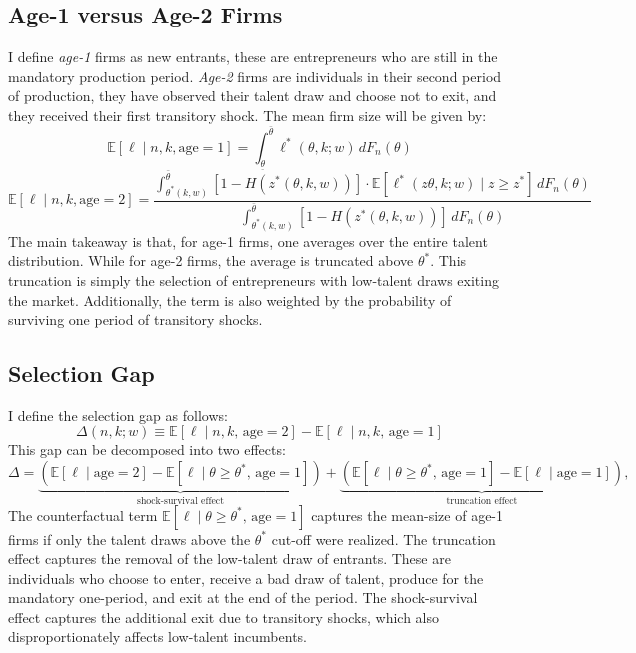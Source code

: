 
    \subsection{Age-1 versus Age-2 Firms}

    I define \textit{age-1} firms as new entrants, these are entrepreneurs who are still in the mandatory production period. \textit{Age-2} firms are individuals in their second period of production, they have observed their talent draw and choose not to exit, and they received their first transitory shock. The mean firm size will be given by:
    \begin{equation}
        \mathbb{E}[\ell \mid n, k, \text{age} = 1] = \int_{\underline{\theta}}^{\bar{\theta}} \ell^*(\theta, k; w) \, dF_n(\theta) \label{eq:age1_mean}
    \end{equation}
    \begin{equation}
       \mathbb{E}[\ell \mid n, k, \text{age} = 2] =  \frac{\displaystyle\int_{\theta^*(k,w)}^{\bar{\theta}} [1 - H(z^*(\theta,k,w))] \cdot \mathbb{E}[\ell^*(z\theta, k; w) \mid z \geq z^*] \, dF_n(\theta) }{\displaystyle\int_{\theta^*(k,w)}^{\bar{\theta}} [1 - H(z^*(\theta,k,w))] \, dF_n(\theta) } \label{eq:age2_mean}
    \end{equation}
    The main takeaway is that, for age-1 firms, one averages over the entire talent distribution. While for age-2 firms, the average is truncated above $\theta^*$. This truncation is simply the selection of entrepreneurs with low-talent draws exiting the market. Additionally, the term is also weighted by the probability of surviving one period of transitory shocks.

    \subsection{Selection Gap}

    I define the selection gap as follows:
    \begin{equation}
        \Delta(n, k; w) \equiv \mathbb{E}[\ell \mid n, k,\, \text{age} = 2] - \mathbb{E}[\ell \mid n, k,\, \text{age} = 1]
    \end{equation}
    This gap can be decomposed into two effects:
    \begin{equation}
\Delta = \underbrace{\left( \mathbb{E}[\ell \mid \text{age}=2] -  \mathbb{E}[\ell \mid \theta \geq \theta^*,\, \text{age}=1]\right)}_{\text{shock-survival effect}} + \underbrace{\left( \mathbb{E}[\ell \mid \theta \geq \theta^*,\, \text{age}=1] -  \mathbb{E}[\ell \mid \text{age}=1]\right)}_{\text{truncation effect}},
\end{equation}
    The counterfactual term $\mathbb{E}[\ell \mid \theta \geq \theta^*,\, \text{age}=1]$ captures the mean-size of age-1 firms if only the talent draws above the $\theta^*$ cut-off were realized. The truncation effect captures the removal of the low-talent draw of entrants. These are individuals who choose to enter, receive a bad draw of talent, produce for the mandatory one-period, and exit at the end of the period. The shock-survival effect captures the additional exit due to transitory shocks, which also disproportionately affects low-talent incumbents.

